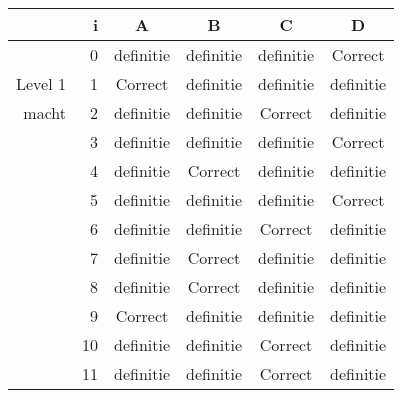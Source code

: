 \begin{tabular}{ rr| c|c|c|c}\hline\hline
     & i & \textbf{A} & \textbf{B} & \textbf{C} & \textbf{D}\\\hline

&0&definitie&definitie&definitie&Correct\cellcolor[gray]{0.6}\\
Level 1 & 1&Correct\cellcolor[gray]{0.6}&definitie&definitie&definitie\\
macht &2&definitie&definitie&Correct\cellcolor[gray]{0.6}&definitie\\
&3&definitie&definitie&definitie&Correct\cellcolor[gray]{0.6}\\
&4&definitie&Correct\cellcolor[gray]{0.6}&definitie&definitie\\
&5&definitie&definitie&definitie&Correct\cellcolor[gray]{0.6}\\
&6&definitie&definitie&Correct\cellcolor[gray]{0.6}&definitie\\
&7&definitie&Correct\cellcolor[gray]{0.6}&definitie&definitie\\
&8&definitie&Correct\cellcolor[gray]{0.6}&definitie&definitie\\
&9&Correct\cellcolor[gray]{0.6}&definitie&definitie&definitie\\
&10&definitie&definitie&Correct\cellcolor[gray]{0.6}&definitie\\
&11&definitie&definitie&Correct\cellcolor[gray]{0.6}&definitie\\
\hline\end{tabular}\par\ \newline

